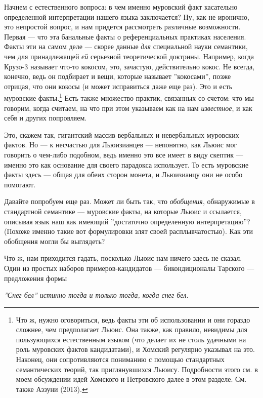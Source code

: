 \documentclass[11pt]{book}
\begin{document}
Начнем с естественного вопроса: в чем именно муровский факт касательно определенной интерпретации нашего языка заключается? Ну, как не иронично, это непростой вопрос, и нам придется рассмотреть различные возможности. Первая --- что эта банальные факты о референциальных практиках населения. Факты эти на самом деле --- скорее данные \textit{для} специальной науки семантики, чем для принадлежащей \textit{ей} серьезной теоретической доктрины. Например, когда Крузо-3 называет что-то кокосом, это, зачастую, действительно кокос. Не всегда, конечно, ведь он подбирает и вещи, которые называет ''кокосами'', позже отрицая, что они кокосы (и может исправиться даже еще раз). Это и есть муровские факты.\footnote{Что ж, нужно оговориться, ведь факты эти об использовании и они гораздо сложнее, чем предполагает Льюис. Она также, как правило, невидимы для пользующихся естественным языком (что делает их не столь удачными на роль муровских фактов кандидатами), и Хомский регулярно указывал на это. Наконец, они сопротивляются пониманию с помощью стандартных семантических теорий, так приглянувшихся Льюису. Подробности этого см. в моем обсуждении идей Хомского и Петровского далее в этом разделе. См. также Аззуни (2013).} Есть также множество практик, связанных со счетом: что мы говорим, когда считаем, на что при этом указываем как на нам \textit{известное}, и как себя и других попровляем.

Это, скажем так, гигантский массив вербальных и невербальных муровских фактов. Но --- к несчастью для Льюизианцев --- непонятно, как Льюис мог говорить о чем-либо подобном, ведь именно это все имеет в виду скептик --- именно это как основание для своего парадокса использует. То есть муровские факты здесь --- общая для обеих сторон монета, и Льюизианцу они не особо помогают.

Давайте попробуем еще раз. Может ли быть так, что \textit{обобщения}, обнаружимые в стандартной семантике --- муровские факты, на которые Льюис и ссылается, описывая язык наш как имеющий ''достаточно определенную интерпретацию''? (Похоже именно такие вот формулировки злят своей расплывчатостью). Как эти обобщения могли бы выглядеть?

Что ж, нам приходится гадать, посколько Льюис нам ничего здесь не сказал. Один из простых наборов примеров-кандидатов --- бикондиционалы Тарского --- предложения формы

\smallskip

\textit{''Снег бел'' истинно тогда и только тогда, когда снег бел.}

\smallskip
\end{document}
